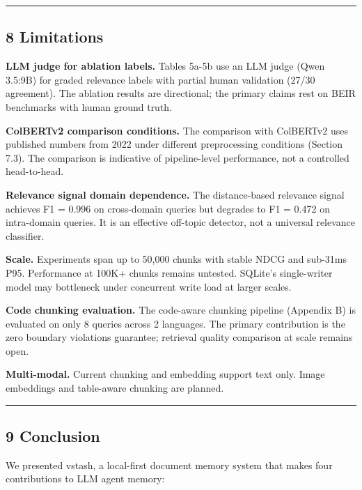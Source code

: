\documentclass[
  11pt]{article}
\begin{document}
\begin{center}\rule{0.5\linewidth}{0.5pt}\end{center}

\subsection{8 Limitations}\label{limitations}

\textbf{LLM judge for ablation labels.} Tables 5a-5b use an LLM judge (Qwen 3.5:9B) for graded relevance labels with partial human validation (27/30 agreement). The ablation results are directional; the primary claims rest on BEIR benchmarks with human ground truth.

\textbf{ColBERTv2 comparison conditions.} The comparison with ColBERTv2 uses published numbers from 2022 under different preprocessing conditions (Section 7.3). The comparison is indicative of pipeline-level performance, not a controlled head-to-head.

\textbf{Relevance signal domain dependence.} The distance-based relevance signal achieves F1 = 0.996 on cross-domain queries but degrades to F1 = 0.472 on intra-domain queries. It is an effective off-topic detector, not a universal relevance classifier.

\textbf{Scale.} Experiments span up to 50,000 chunks with stable NDCG and sub-31ms P95. Performance at 100K+ chunks remains untested. SQLite's single-writer model may bottleneck under concurrent write load at larger scales.

\textbf{Code chunking evaluation.} The code-aware chunking pipeline (Appendix B) is evaluated on only 8 queries across 2 languages. The primary contribution is the zero boundary violations guarantee; retrieval quality comparison at scale remains open.

\textbf{Multi-modal.} Current chunking and embedding support text only. Image embeddings and table-aware chunking are planned.

\begin{center}\rule{0.5\linewidth}{0.5pt}\end{center}

\subsection{9 Conclusion}\label{conclusion}

We presented vstash, a local-first document memory system that makes four contributions to LLM agent memory:
\end{document}
